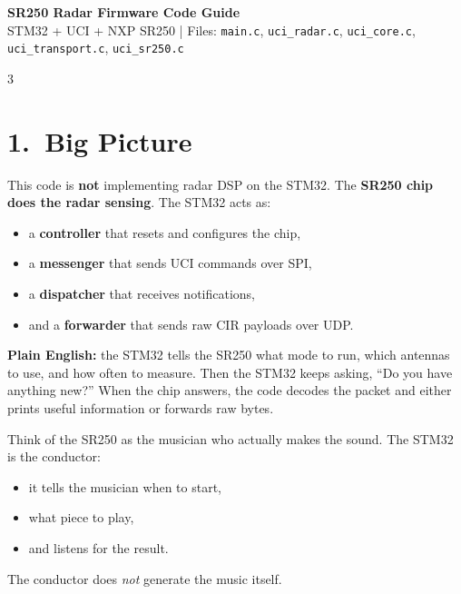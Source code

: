 \documentclass[10pt]{article}
\begin{document}
\footnotesize
\begin{center}
  {\Large\bfseries SR250 Radar Firmware Code Guide}\\[2pt]
  \small STM32 + UCI + NXP SR250 \quad|\quad
  Files: \texttt{main.c}, \texttt{uci\_radar.c}, \texttt{uci\_core.c}, \texttt{uci\_transport.c}, \texttt{uci\_sr250.c}
\end{center}

\begin{multicols*}{3}

\section*{1.\ Big Picture}

\begin{tcolorbox}[intubox={What This Firmware Is Actually Doing}]
This code is \textbf{not} implementing radar DSP on the STM32.
The \textbf{SR250 chip does the radar sensing}. The STM32 acts as:
\begin{itemize}
  \item a \textbf{controller} that resets and configures the chip,
  \item a \textbf{messenger} that sends UCI commands over SPI,
  \item a \textbf{dispatcher} that receives notifications,
  \item and a \textbf{forwarder} that sends raw CIR payloads over UDP.
\end{itemize}
\end{tcolorbox}

\textbf{Plain English:} the STM32 tells the SR250 what mode to run, which antennas to use, and how often to measure. Then the STM32 keeps asking, ``Do you have anything new?'' When the chip answers, the code decodes the packet and either prints useful information or forwards raw bytes.

\begin{tcolorbox}[analogybox={Analogy --- Orchestra Conductor}]
Think of the SR250 as the musician who actually makes the sound.
The STM32 is the conductor:
\begin{itemize}
  \item it tells the musician when to start,
  \item what piece to play,
  \item and listens for the result.
\end{itemize}
The conductor does \emph{not} generate the music itself.
\end{tcolorbox}


\end{multicols*}
\end{document}
